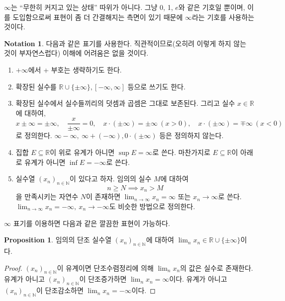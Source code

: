 \documentclass[11pt]{book}
\numberwithin{equation}{chapter}
\def\NN{\mathbb{N}}
\def\RR{\mathbb{R}}
\theoremstyle{definition}
\newtheorem{prop}[thm]{Proposition}
\newtheorem{notn}[thm]{Notation}
\begin{document}
\(\infty\)는 ``무한히 커지고 있는 상태'' 따위가 아니다. 그냥 0, 1, \(e\)와 같은 기호일 뿐이며, 이를 도입함으로써 표현이 좀 더 간결해지는 측면이 있기 때문에 \(\infty\)라는 기호를 사용하는 것이다.

\begin{notn}
    다음과 같은 표기를 사용한다. 직관적이므로(오히려 이렇게 하지 않는 것이 부자연스럽다) 이해에 어려움은 없을 것이다.
    \begin{enumerate} [label=(\alph*), leftmargin=2\parindent]
        \item \(+\infty\)에서 + 부호는 생략하기도 한다.
        \item 확장된 실수를 \(\RR \cup \{\pm \infty\}, [-\infty, \infty]\) 등으로 쓰기도 한다.
        \item 확장된 실수에서 실수들끼리의 덧셈과 곱셈은 그대로 보존된다. 그리고 실수 \(x \in \RR\)에 대하여,
        \[
            x \pm \infty = \pm \infty, \quad \frac{x}{\pm \infty} = 0, \quad x \cdot (\pm \infty) = \pm \infty \ (x > 0), \quad  x \cdot (\pm \infty) = \mp \infty \ (x < 0)
        \]
        로 정의한다. \(\infty - \infty, \ \infty + (-\infty), 0 \cdot (\pm \infty)\) 등은 정의하지 않는다.
        \item 집합 \(E \subseteq \RR\)이 위로 유계가 아니면 \(\sup E = \infty\)로 쓴다. 마찬가지로 \(E \subseteq \RR\)이 아래로 유계가 아니면 \(\inf E = -\infty\)로 쓴다.
        \item 실수열 \((x_n)_{n \in \NN}\)이 있다고 하자. 임의의 실수 \(M\)에 대하여
        \[
        n \ge N \implies x_n > M
        \]
        을 만족시키는 자연수 \(N\)이 존재하면 \(\lim_{n \to \infty } x_n = \infty\) 또는 \(x_n \to \infty\)로 쓴다. \(\lim_{n \to \infty} x_n = -\infty, \ x_n \to -\infty\)도 비슷한 방법으로 정의한다.
    \end{enumerate}
\end{notn}

\(\infty\) 표기를 이용하면 다음과 같은 깔끔한 표현이 가능하다.

    \begin{prop} \label{prop 2.4.2}
        임의의 단조 실수열 \((x_n)_{n \in \NN}\)에 대하여 \(\lim_{n} x_n \in \RR \cup \{\pm \infty\}\)이다.
    \end{prop}
    \begin{proof}
        \((x_n)_{n \in \NN}\)이 유계이면 단조수렴정리에 의해 \(\lim_{n} x_n\)의 값은 실수로 존재한다. 유계가 아니고 \((x_n)_{n \in \NN}\)이 단조증가하면 \(\lim_{n} x_n = \infty\)이다. 유계가 아니고 \((x_n)_{n \in \NN}\)이 단조감소하면 \(\lim_{n} x_n = -\infty\)이다. 
    \end{proof}
\end{document}
